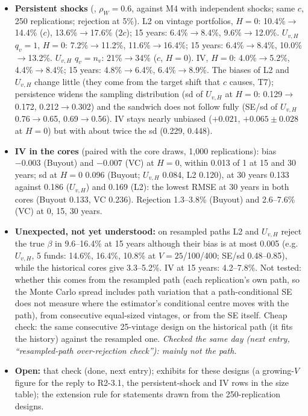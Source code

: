\documentclass[11pt]{article}
\newcommand{\code}[1]{\texttt{\detokenize{#1}}}
\begin{document}
\begin{itemize}
\item \textbf{Persistent shocks} (\code{m4p}, $\rho_W=0.6$, against M4 with independent shocks; same $c$, 250 replications; rejection at 5\%). L2 on vintage portfolios, $H=0$: 10.4\%$\to$14.4\% ($c$), 13.6\%$\to$17.6\% ($2c$); 15 years: 6.4\%$\to$8.4\%, 9.6\%$\to$12.0\%. $U_{v,H}$ $q_v=1$, $H=0$: 7.2\%$\to$11.2\%, 11.6\%$\to$16.4\%; 15 years: 6.4\%$\to$8.4\%, 10.0\%$\to$13.2\%. $U_{v,H}$ $q_v=n_v$: 21\%$\to$34\% ($c$, $H=0$). IV, $H=0$: 4.0\%$\to$5.2\%, 4.4\%$\to$8.4\%; 15 years: 4.8\%$\to$6.4\%, 6.4\%$\to$8.9\%. The biases of L2 and $U_{v,H}$ change little (they come from the target shift that $c$ causes, T7); persistence widens the sampling distribution (sd of $U_{v,H}$ at $H=0$: 0.129$\to$0.172, 0.212$\to$0.302) and the sandwich does not follow fully (SE/sd of $U_{v,H}$ 0.76$\to$0.65, 0.69$\to$0.56). IV stays nearly unbiased ($+0.021$, $+0.065\pm0.028$ at $H=0$) but with about twice the sd (0.229, 0.448).
\item \textbf{IV in the cores} (paired with the core draws, 1{,}000 replications): bias $-0.003$ (Buyout) and $-0.007$ (VC) at $H=0$, within 0.013 of 1 at 15 and 30 years; sd at $H=0$ 0.096 (Buyout; $U_{v,H}$ 0.084, L2 0.120), at 30 years 0.133 against 0.186 ($U_{v,H}$) and 0.169 (L2): the lowest RMSE at 30 years in both cores (Buyout 0.133, VC 0.236). Rejection 1.3--3.8\% (Buyout) and 2.6--7.6\% (VC) at 0, 15, 30 years.
\item \textbf{Unexpected, not yet understood:} on resampled paths L2 and $U_{v,H}$ reject the true $\beta$ in 9.6--16.4\% at 15 years although their bias is at most 0.005 (e.g.\ $U_{v,H}$, 5 funds: 14.6\%, 16.4\%, 10.8\% at $V=25$/100/400; SE/sd 0.48--0.85), while the historical cores give 3.3--5.2\%. IV at 15 years: 4.2--7.8\%. Not tested: whether this comes from the resampled path (each replication's own path, so the Monte Carlo spread includes path variation that a path-conditional SE does not measure where the estimator's conditional centre moves with the path), from consecutive equal-sized vintages, or from the SE itself. Cheap check: the same consecutive 25-vintage design on the historical path (it fits the history) against the resampled one. \emph{Checked the same day (next entry, ``resampled-path over-rejection check''): mainly not the path.}
\item \textbf{Open:} that check (done, next entry); exhibits for these designs (a growing-$V$ figure for the reply to R2-3.1, the persistent-shock and IV rows in the size table); the extension rule for statements drawn from the 250-replication \code{m4p} designs.
\end{itemize}
\end{document}
